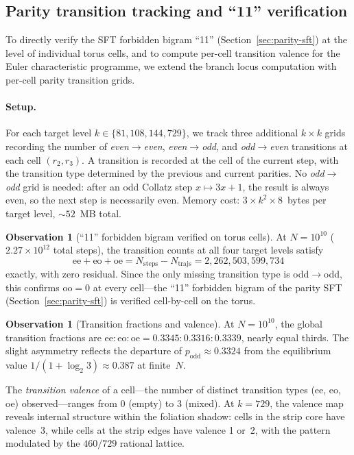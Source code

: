 \documentclass[11pt,a4paper]{article}
\theoremstyle{plain}
\theoremstyle{definition}
\newtheorem{observation}[theorem]{Observation}
\begin{document}
\subsection{Parity transition tracking and ``11'' verification}\label{ssec:transitions}

To directly verify the SFT forbidden bigram ``11''
(Section~\ref{sec:parity-sft}) at the level of individual torus cells,
and to compute per-cell transition valence for the Euler characteristic
programme, we extend the branch locus computation with per-cell parity
transition grids.

\paragraph{Setup.}
For each target level $k \in \{81, 108, 144, 729\}$, we track three
additional $k \times k$ grids recording the number of
\emph{even$\to$even}, \emph{even$\to$odd}, and \emph{odd$\to$even}
transitions at each cell $(r_2, r_3)$.  A transition is recorded at
the cell of the current step, with the transition type determined by
the previous and current parities.  No \emph{odd$\to$odd} grid is
needed: after an odd Collatz step $x \mapsto 3x+1$, the result is
always even, so the next step is necessarily even.  Memory cost:
$3 \times k^2 \times 8$~bytes per target level, ${\sim}52$~MB total.

\begin{observation}[``11'' forbidden bigram verified on torus cells]
\label{obs:oo-verified}
    At $N = 10^{10}$ ($2.27 \times 10^{12}$ total steps), the transition
    counts at all four target levels satisfy
    \[
        \mathrm{ee} + \mathrm{eo} + \mathrm{oe}
        = N_{\mathrm{steps}} - N_{\mathrm{trajs}}
        = 2{,}262{,}503{,}599{,}734
    \]
    exactly, with zero residual.  Since the only missing transition
    type is odd$\to$odd, this confirms $\mathrm{oo} = 0$ at every
    cell---the ``11'' forbidden bigram of the parity SFT
    (Section~\ref{sec:parity-sft}) is verified cell-by-cell on the
    torus.
\end{observation}

\begin{observation}[Transition fractions and valence]
\label{obs:trans-fractions}
    At $N = 10^{10}$, the global transition fractions are
    $\mathrm{ee} : \mathrm{eo} : \mathrm{oe} = 0.3345 : 0.3316 : 0.3339$,
    nearly equal thirds.  The slight asymmetry reflects the departure
    of $p_{\mathrm{odd}} \approx 0.3324$ from the equilibrium value
    $1/(1 + \log_2 3) \approx 0.387$ at finite~$N$.

    The \emph{transition valence} of a cell---the number of distinct
    transition types (ee, eo, oe) observed---ranges from 0 (empty) to 3
    (mixed).  At $k = 729$, the valence map reveals internal structure
    within the foliation shadow: cells in the strip core have valence~3,
    while cells at the strip edges have valence 1 or~2, with the pattern
    modulated by the $460/729$ rational lattice.
\end{observation}
\end{document}
